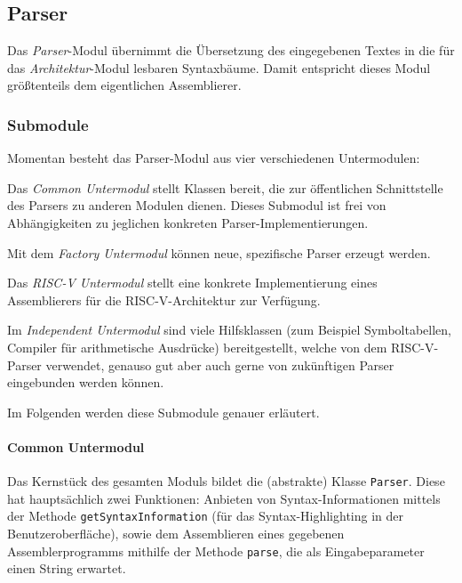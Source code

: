 \subsection{Parser}

Das \emph{Parser}-Modul übernimmt die Übersetzung des eingegebenen Textes in
die für das \emph{Architektur}-Modul lesbaren Syntaxbäume. Damit entspricht
dieses Modul größtenteils dem eigentlichen Assemblierer.

\subsubsection{Submodule}

Momentan besteht das Parser-Modul aus vier verschiedenen Untermodulen:
\begin{senumerate}{-0.3cm}

  \item Das \emph{Common Untermodul} stellt Klassen bereit, die zur öffentlichen
  Schnittstelle des Parsers zu anderen Modulen dienen. Dieses Submodul ist frei
  von Abhängigkeiten zu jeglichen konkreten Parser-Implementierungen.

  \item Mit dem \emph{Factory Untermodul} können neue, spezifische Parser
  erzeugt werden.

  \item Das \emph{RISC-V Untermodul} stellt eine konkrete Implementierung eines
  Assemblierers für die RISC-V-Architektur zur Verfügung.

  \item Im \emph{Independent Untermodul} sind viele Hilfsklassen (zum Beispiel
  Symboltabellen, Compiler für arithmetische Ausdrücke) bereitgestellt, welche
  von dem RISC-V-Parser verwendet, genauso gut aber auch gerne von zukünftigen
  Parser eingebunden werden können.

\end{senumerate}

Im Folgenden werden diese Submodule genauer erläutert.

\paragraph{Common Untermodul}

Das Kernstück des gesamten Moduls bildet die (abstrakte) Klasse \texttt{Parser}.
Diese hat hauptsächlich zwei Funktionen: Anbieten von Syntax-Informationen
mittels der Methode \texttt{getSyntaxInformation} (für das Syntax-Highlighting
in der Benutzeroberfläche), sowie dem Assemblieren eines gegebenen
Assemblerprogramms mithilfe der Methode \texttt{parse}, die als Eingabeparameter
einen String erwartet.

